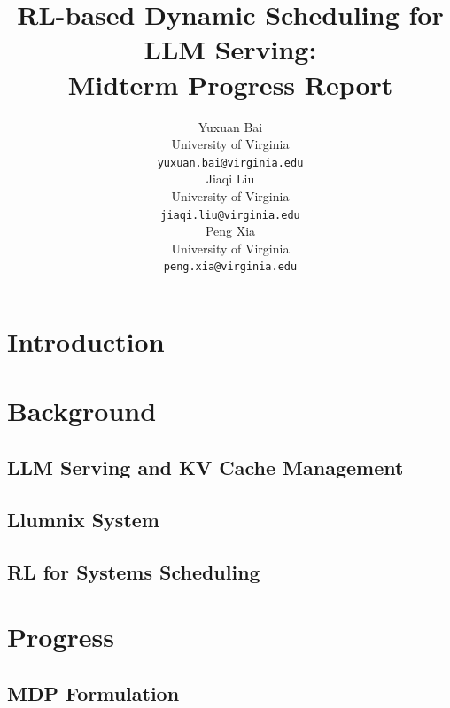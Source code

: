 \documentclass{article}
\title{RL-based Dynamic Scheduling for LLM Serving:\\Midterm Progress Report}
\author{
  Yuxuan Bai \\
  University of Virginia \\
  \texttt{yuxuan.bai@virginia.edu} \\
  \And
  Jiaqi Liu \\
  University of Virginia \\
  \texttt{jiaqi.liu@virginia.edu} \\
  \And
  Peng Xia \\
  University of Virginia \\
  \texttt{peng.xia@virginia.edu} \\
}
\begin{document}
\maketitle

\begin{abstract}
\end{abstract}

\section{Introduction}


\section{Background}


\subsection{LLM Serving and KV Cache Management}

\subsection{Llumnix System}

\subsection{RL for Systems Scheduling}

\section{Progress}


\subsection{MDP Formulation}
\end{document}

